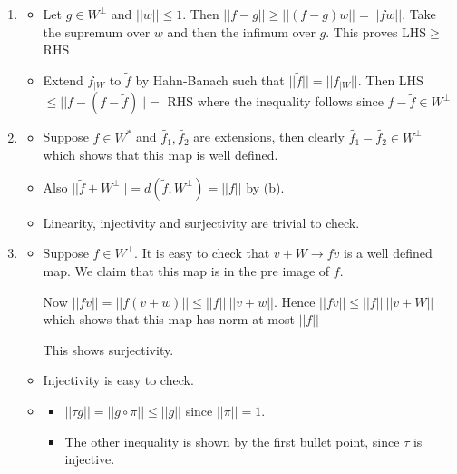 \documentclass{article}
\begin{document}
\begin{enumerate}
\begin{enumerate}
        \item \begin{itemize}
            \item Let $g \in W^\perp$ and $||w||\leq 1$. Then $||f-g|| \geq ||(f-g)w||=||fw||$. Take the supremum over $w$ and then the infimum over $g$. This proves LHS$\geq$RHS

            \item Extend $f_{|W}$ to $\tilde{f}$ by Hahn-Banach such that $||\tilde{f}||=||f_{|W}||$. Then LHS$\leq||f-(f-\tilde{f})||=$ RHS where the inequality follows since $f-\tilde{f} \in W^\perp$
        \end{itemize}
        
        \item \begin{itemize}
            \item Suppose $f \in W^*$ and $\tilde{f_1},\tilde{f_2}$ are extensions, then clearly $\tilde{f_1}-\tilde{f_2} \in W^\perp$ which shows that this map is well defined.

            \item Also $||\tilde{f}+W^\perp||=d(\tilde{f},W^\perp)=||f||$ by (b). 

            \item Linearity, injectivity and surjectivity are trivial to check.
        \end{itemize}
        
        \item \begin{itemize}
            \item Suppose $f \in W^\perp$. It is easy to check that $v+W \to fv$ is a well defined map. We claim that this map is in the pre image of $f$.
            
            Now $||fv||=||f(v+w)|| \leq ||f|| \ ||v+w||$. Hence $||fv|| \leq ||f|| \ ||v+W||$ which shows that this map has norm at most $||f||$
            
            This shows surjectivity.

            \item Injectivity is easy to check. 
            
            \item \begin{itemize}
                \item $||\tau g|| = ||g \circ\pi|| \leq ||g||$ since $||\pi||=1$. 

                \item The other inequality is shown by the first bullet point, since $\tau$ is injective.
            \end{itemize}
            

\end{itemize}
\end{enumerate}
\end{enumerate}
\end{document}
